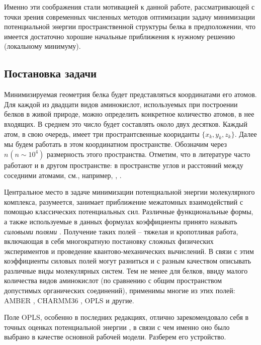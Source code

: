   Именно эти соображения стали мотивацией к данной работе, рассматривающей с точки зрения современных численных методов оптимизации задачу минимизации потенциальной энергии пространственной структуры белка в предположении, что имеется достаточно хорошие начальные приближения к нужному решению (локальному минимуму).

  \subsection{Постановка задачи} \label{subsec:sec1/su2}

  Минимизируемая геометрия белка будет представляться координатами его атомов.
  Для каждой из двадцати видов аминокислот, используемых при построении белков в живой природе, можно определить конкретное количество атомов, в нее входящих.
  В среднем это число будет составлять около двух десятков.
  Каждый атом, в свою очередь, имеет три пространтсвенные коориданты $\{x_k ,y_k ,z_k\}$.
  Далее мы будем работать в этом координатном пространстве.
  Обозначим через $n_{ }\left(n\sim 10^4\right)$ размерность этого пространства.
  Отметим, что в литературе часто работают и в другом пространстве: в пространстве углов и расстояний между соседними атомами, см., например, \cite{canutescu2003cyclic}, \cite{coutsias2004kinematic}. 

  Центральное место в задаче минимизации потенциальной энергии молекулярного комплекса, разумеется, занимает приближение межатомных взаимодействий с помощью классических потенциальных сил.
  Различные функциональные формы, а также используемые в данных формулах коэффициенты принято называть \textit{силовыми полями} \cite{Ponder2003}.
  Получение таких полей -- тяжелая и кропотливая работа, включающая в себя многократную постановку сложных физических экспериментов и проведение квантово-механических вычислений.
  В связи с этим коэффициенты силовых полей могут разниться и с разным качеством описывать различные виды молекулярных систем.
  Тем не менее для белков, ввиду малого количества видов аминокислот (по сравнению с общим пространством допустимых органических соединений), применимы многие из этих полей: AMBER \cite{Cornell1995}, CHARMM36 \cite{Huang2017}, OPLS \cite{Jorgensen1996} и другие.

  Поле OPLS, особенно в последних редакциях, отлично зарекомендовало себя в точных оценках потенциальной энергии \cite{Sweere2017}, в связи с чем именно оно было
  выбрано в качестве основной рабочей модели.
  Разберем его устройство.

